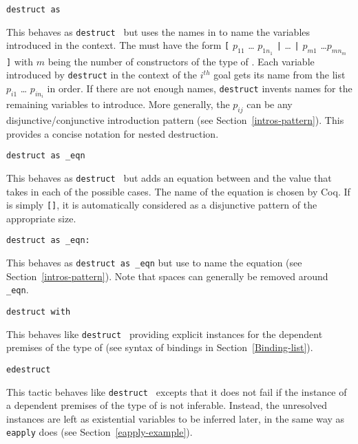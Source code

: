 \begin{Variants}
\item{\tt destruct {\term} as {\disjconjintropattern}}
  
  This behaves as {\tt destruct {\term}} but uses the names in
  {\intropattern} to name the variables introduced in the context.
  The {\intropattern} must have the form {\tt [} $p_{11}$ \ldots
  $p_{1n_1}$ {\tt |} {\ldots} {\tt |} $p_{m1}$ \ldots $p_{mn_m}$ {\tt
    ]} with $m$ being the number of constructors of the type of
  {\term}. Each variable introduced by {\tt destruct} in the context
  of the $i^{th}$ goal gets its name from the list $p_{i1}$ \ldots
  $p_{in_i}$ in order. If there are not enough names, {\tt destruct}
  invents names for the remaining variables to introduce. More
  generally, the $p_{ij}$ can be any disjunctive/conjunctive
  introduction pattern (see Section~\ref{intros-pattern}). This
  provides a concise notation for nested destruction.


\item{\tt destruct {\term} as {\disjconjintropattern} \_eqn}

  This behaves as {\tt destruct {\term}} but adds an equation between
  {\term} and the value that {\term} takes in each of the possible
  cases.  The name of the equation is chosen by Coq. If  
  {\disjconjintropattern} is simply {\tt []}, it is automatically considered
  as a disjunctive pattern of the appropriate size.

\item{\tt destruct {\term} as {\disjconjintropattern} \_eqn: {\namingintropattern}}

  This behaves as {\tt destruct {\term} as
    {\disjconjintropattern} \_eqn} but use {\namingintropattern} to
  name the equation (see Section~\ref{intros-pattern}). Note that spaces 
  can generally be removed around {\tt \_eqn}.

\item{\tt destruct {\term} with \bindinglist}

  This behaves like \texttt{destruct {\term}} providing explicit
  instances for the dependent premises of the type of {\term} (see
  syntax of bindings in Section~\ref{Binding-list}).

\item{\tt edestruct {\term}}

  This tactic behaves like \texttt{destruct {\term}} excepts that it
  does not fail if the instance of a dependent premises of the type of
  {\term} is not inferable. Instead, the unresolved instances are left
  as existential variables to be inferred later, in the same way as
  {\tt eapply} does (see Section~\ref{eapply-example}).


\end{Variants}
